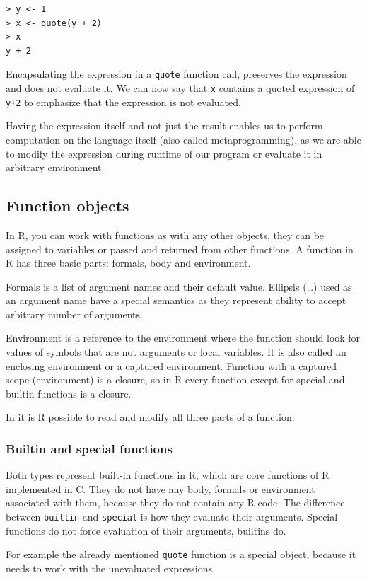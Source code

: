 \documentclass[thesis=B,english]{FITthesis}[2012/10/20]
\begin{document}
\begin{verbatim}
> y <- 1
> x <- quote(y + 2)
> x
y + 2
\end{verbatim}

Encapsulating the expression in a \verb|quote| function call, preserves the expression and does not evaluate it. We can now say that \verb|x| contains a quoted expression\cite{advR} of \verb|y+2| to emphasize that the expression is not evaluated. 

Having the expression itself and not just the result enables us to perform computation on the language itself (also called metaprogramming), as we are able to modify the expression during runtime of our program or evaluate it in arbitrary environment.

\subsection{Function objects}
In R, you can work with functions as with any other objects, they can be assigned to variables or passed and returned from other functions. A function in R has three basic parts: formals, body and environment. 

Formals is a list of argument names and their default value. Ellipsis (\ldots) used as an argument name have a special semantics as they represent ability to accept arbitrary number of arguments. 

Environment is a reference to the environment where the function should look for values of symbols that are not arguments or local variables. It is also called an enclosing environment or a captured environment. Function with a captured scope (environment) is a closure, so in R every function except for special and builtin functions is a closure.

In it is R possible to read and modify all three parts of a function.

\subsubsection{Builtin and special functions}
Both types represent built-in functions in R, which are core functions of R implemented in C. They do not have any body, formals or environment associated with them, because they do not contain any R code. The difference between \verb|builtin| and \verb|special| is how they evaluate their arguments. Special functions do not force evaluation of their arguments, builtins do.

For example the already mentioned \verb|quote| function is a special object, because it needs to work with the unevaluated expressions. 
\end{document}
